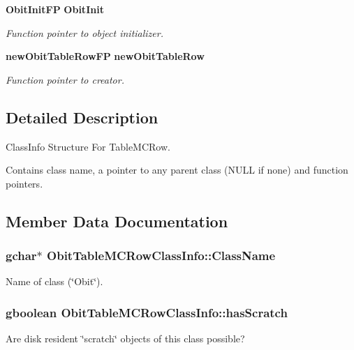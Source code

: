 \begin{CompactItemize}
{\bf Obit\-Init\-FP} {\bf Obit\-Init}
\begin{CompactList}\small\item\em Function pointer to object initializer. \item\end{CompactList}\item 
{\bf new\-Obit\-Table\-Row\-FP} {\bf new\-Obit\-Table\-Row}
\begin{CompactList}\small\item\em Function pointer to creator. \item\end{CompactList}\end{CompactItemize}


\subsection{Detailed Description}
Class\-Info Structure For Table\-MCRow. 

Contains class name, a pointer to any parent class (NULL if none) and function pointers. 



\subsection{Member Data Documentation}
\subsubsection{\setlength{\rightskip}{0pt plus 5cm}gchar$\ast$ {\bf Obit\-Table\-MCRow\-Class\-Info::Class\-Name}}\label{structObitTableMCRowClassInfo_o2}


Name of class (\char`\"{}Obit\char`\"{}). 

\subsubsection{\setlength{\rightskip}{0pt plus 5cm}gboolean {\bf Obit\-Table\-MCRow\-Class\-Info::has\-Scratch}}\label{structObitTableMCRowClassInfo_o1}


Are disk resident \char`\"{}scratch\char`\"{} objects of this class possible? 

